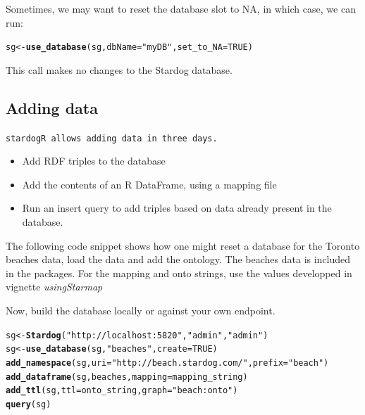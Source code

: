 \documentclass{article}\usepackage[]{graphicx}\usepackage[]{xcolor}
\makeatletter
\newcommand{\hlnum}[1]{\textcolor[rgb]{0.686,0.059,0.569}{#1}}%
\newcommand{\hlstr}[1]{\textcolor[rgb]{0.192,0.494,0.8}{#1}}%
\newcommand{\hlstd}[1]{\textcolor[rgb]{0.345,0.345,0.345}{#1}}%
\newcommand{\hlkwb}[1]{\textcolor[rgb]{0.69,0.353,0.396}{#1}}%
\newcommand{\hlkwc}[1]{\textcolor[rgb]{0.333,0.667,0.333}{#1}}%
\newcommand{\hlkwd}[1]{\textcolor[rgb]{0.737,0.353,0.396}{\textbf{#1}}}%
\newenvironment{kframe}{%
 \def\at@end@of@kframe{}%
 \ifinner\ifhmode%
  \def\at@end@of@kframe{\end{minipage}}%
  \begin{minipage}{\columnwidth}%
 \fi\fi%
 \def\FrameCommand##1{\hskip\@totalleftmargin \hskip-\fboxsep
 \colorbox{shadecolor}{##1}\hskip-\fboxsep
     \hskip-\linewidth \hskip-\@totalleftmargin \hskip\columnwidth}%
 \MakeFramed {\advance\hsize-\width
   \@totalleftmargin\z@ \linewidth\hsize
   \@setminipage}}%
 {\par\unskip\endMakeFramed%
 \at@end@of@kframe}
\newenvironment{knitrout}{}{} %
\makeatother
\begin{document}
Sometimes, we may want to reset the database slot to NA, in which case, we can run:

\begin{knitrout}
\color{fgcolor}\begin{kframe}
\begin{alltt}
\hlstd{sg} \hlkwb{<-} \hlkwd{use_database}\hlstd{(sg,} \hlkwc{dbName} \hlstd{=} \hlstr{"myDB"}\hlstd{,} \hlkwc{set_to_NA} \hlstd{=} \hlnum{TRUE}\hlstd{)}
\end{alltt}
\end{kframe}
\end{knitrout}

This call makes no changes to the Stardog database.

\subsection{Adding data}

\tt{stardogR} allows adding data in three days.

\begin{itemize}
  \item Add RDF triples to the database
  \item Add the contents of an R DataFrame, using a mapping file
  \item Run an insert query to add triples based on data already present in the database.
\end{itemize}

The following code snippet shows how one might reset a database for the Toronto beaches data, load the data and add the ontology. The beaches data is included in the packages. For the mapping and onto strings, use the values developped in vignette \it{usingStarmap}


Now, build the database locally or against your own endpoint.

\begin{knitrout}
\color{fgcolor}\begin{kframe}
\begin{alltt}
\hlstd{sg} \hlkwb{<-} \hlkwd{Stardog}\hlstd{(}\hlstr{"http://localhost:5820"}\hlstd{,} \hlstr{"admin"}\hlstd{,} \hlstr{"admin"}\hlstd{)}
\hlstd{sg} \hlkwb{<-} \hlkwd{use_database}\hlstd{(sg,} \hlstr{"beaches"}\hlstd{,} \hlkwc{create} \hlstd{=} \hlnum{TRUE}\hlstd{)}
\hlkwd{add_namespace}\hlstd{(sg,} \hlkwc{uri} \hlstd{=} \hlstr{"http://beach.stardog.com/"}\hlstd{,} \hlkwc{prefix} \hlstd{=} \hlstr{"beach"}\hlstd{)}
\hlkwd{add_dataframe}\hlstd{(sg, beaches,} \hlkwc{mapping} \hlstd{= mapping_string)}
\hlkwd{add_ttl}\hlstd{(sg,} \hlkwc{ttl} \hlstd{= onto_string,} \hlkwc{graph} \hlstd{=} \hlstr{"beach:onto"}\hlstd{)}
\hlkwd{query}\hlstd{(sg)}
\end{alltt}
\end{kframe}
\end{knitrout}
\end{document}
